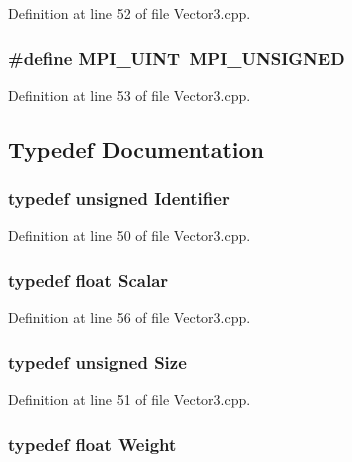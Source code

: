 Definition at line 52 of file Vector3.cpp.

\subsubsection[{MPI\_\-UINT}]{\setlength{\rightskip}{0pt plus 5cm}\#define MPI\_\-UINT~MPI\_\-UNSIGNED}\label{Vector3_8cpp_a36f55c7359c730c7b6be07a113c6af7b}


Definition at line 53 of file Vector3.cpp.



\subsection{Typedef Documentation}
\subsubsection[{Identifier}]{\setlength{\rightskip}{0pt plus 5cm}typedef unsigned {\bf Identifier}}\label{Vector3_8cpp_a25e0b8ddd193bb84ebf6c0eeff6b1c82}


Definition at line 50 of file Vector3.cpp.

\subsubsection[{Scalar}]{\setlength{\rightskip}{0pt plus 5cm}typedef float {\bf Scalar}}\label{Vector3_8cpp_aacf5954d048aaaaef04620896706921d}


Definition at line 56 of file Vector3.cpp.

\subsubsection[{Size}]{\setlength{\rightskip}{0pt plus 5cm}typedef unsigned {\bf Size}}\label{Vector3_8cpp_a772b762114e74538c967388931c4a5e9}


Definition at line 51 of file Vector3.cpp.

\subsubsection[{Weight}]{\setlength{\rightskip}{0pt plus 5cm}typedef float {\bf Weight}}\label{Vector3_8cpp_ad8909b856fa70c7731c787994276fb03}


